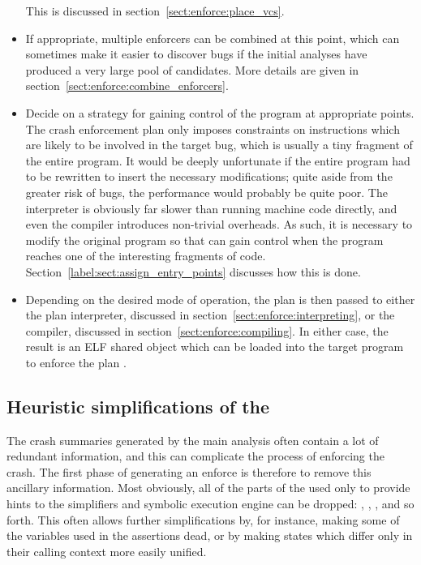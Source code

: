 \begin{itemize}
  This is discussed in section~\ref{sect:enforce:place_vcs}.
\item
  If appropriate, multiple enforcers can be combined at this point,
  which can sometimes make it easier to discover bugs if the initial
  analyses have produced a very large pool of candidates.  More
  details are given in section~\ref{sect:enforce:combine_enforcers}.
\item
  Decide on a strategy for gaining control of the program at
  appropriate points.  The crash enforcement plan only imposes
  constraints on instructions which are likely to be involved in the
  target bug, which is usually a tiny fragment of the entire program.
  It would be deeply unfortunate if the entire program had to be
  rewritten to insert the necessary modifications; quite aside from
  the greater risk of bugs, the performance would probably be quite
  poor.  The interpreter is obviously far slower than running machine
  code directly, and even the compiler introduces non-trivial
  overheads.  As such, it is necessary to modify the original program
  so that {\technique} can gain control when the program reaches one
  of the interesting fragments of code.
  Section~\ref{label:sect:assign_entry_points} discusses how this is
  done.

\item
  Depending on the desired mode of operation, the plan is then passed
  to either the plan interpreter, discussed in
  section~\ref{sect:enforce:interpreting}, or the compiler, discussed
  in section~\ref{sect:enforce:compiling}.  In either case, the result
  is an ELF shared object which can be loaded into the target program
  to enforce the plan .
\end{itemize}

\subsection{Heuristic simplifications of the {\StateMachines} }
\label{sect:enforce:heuristic_simplify}


The crash summaries generated by the main analysis often contain a lot
of redundant information, and this can complicate the process of
enforcing the crash.  The first phase of generating an enforce is
therefore to remove this ancillary information.  Most obviously, all
of the parts of the {\StateMachines} used only to provide hints to the
simplifiers and symbolic execution engine can be dropped:
, , , and so forth.
This often allows further simplifications by, for instance, making
some of the variables used in the assertions dead, or by making states
which differ only in their calling context more easily unified.


